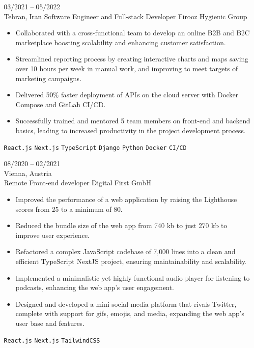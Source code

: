 \documentclass[8pt]{developercv} %
\begin{document}
\begin{entrylist}
        \entry
        {03/2021 -- 05/2022 \\ Tehran, Iran}
        {Software Engineer {\small and} Full-stack Developer}
        {Firooz Hygienic Group}
        {\vspace{-10pt}
            \begin{itemize}[noitemsep,topsep=0pt,parsep=0pt,partopsep=0pt, leftmargin=-1pt]
                \item Collaborated with a cross-functional team to develop an online B2B and B2C marketplace boosting scalability and enhancing customer satisfaction.
                \item Streamlined reporting process by creating interactive charts and maps saving over 10 hours per week in manual work, and improving to meet targets of marketing campaigns.
                \item Delivered 50\% faster deployment of APIs on the cloud server with Docker Compose and GitLab CI/CD.
                \item Successfully trained and mentored 5 team members on front-end and backend basics, leading to increased productivity in the project development process.
            \end{itemize}
            \texttt{React.js} \slashsep \texttt{Next.js} \slashsep \texttt{TypeScript} \slashsep \texttt{Django} \slashsep \texttt{Python} \slashsep \texttt{Docker} \slashsep \texttt{CI/CD}
        }

        \entry
        {08/2020 -- 02/2021 \\ Vienna, Austria \\ Remote}
        {Front-end developer}
        {Digital First GmbH}
        {\vspace{-10pt}
            \begin{itemize}[noitemsep,topsep=0pt,parsep=0pt,partopsep=0pt, leftmargin=-1pt]
                \item Improved the performance of a web application by raising the Lighthouse scores from 25 to a minimum of 80.
                \item Reduced the bundle size of the web app from 740 kb to just 270 kb to improve user experience.
                \item Refactored a complex JavaScript codebase of 7,000 lines into a clean and efficient TypeScript NextJS project, ensuring maintainability and scalability.
                \item Implemented a minimalistic yet highly functional audio player for listening to podcasts, enhancing the web app's user engagement.
                \item Designed and developed a mini social media platform that rivals Twitter, complete with support for gifs, emojis, and media, expanding the web app's user base and features.
            \end{itemize}
            \texttt{React.js} \slashsep \texttt{Next.js} \slashsep \texttt{TailwindCSS}
        }


\end{entrylist}
\end{document}
